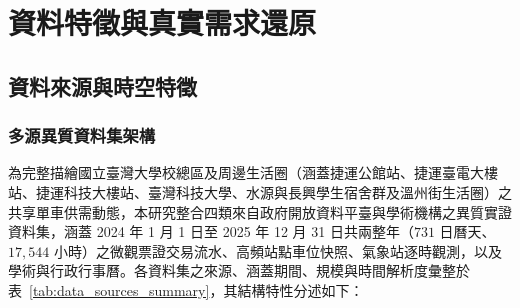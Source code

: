 
\chapter{資料特徵與真實需求還原}\label{chap:Data & Latent Demand Reconstruction}

\section{資料來源與時空特徵}\label{sec:data_sources}

\subsection{多源異質資料集架構}\label{subsec:data_sources_overview}

為完整描繪國立臺灣大學校總區及周邊生活圈（涵蓋捷運公館站、捷運臺電大樓站、捷運科技大樓站、臺灣科技大學、水源與長興學生宿舍群及溫州街生活圈）之共享單車供需動態，本研究整合四類來自政府開放資料平臺與學術機構之異質實證資料集，涵蓋 2024 年 1 月 1 日至 2025 年 12 月 31 日共兩整年（$731$ 日曆天、$17{,}544$ 小時）之微觀票證交易流水、高頻站點車位快照、氣象站逐時觀測，以及學術與行政行事曆。各資料集之來源、涵蓋期間、規模與時間解析度彙整於表~\ref{tab:data_sources_summary}，其結構特性分述如下：

